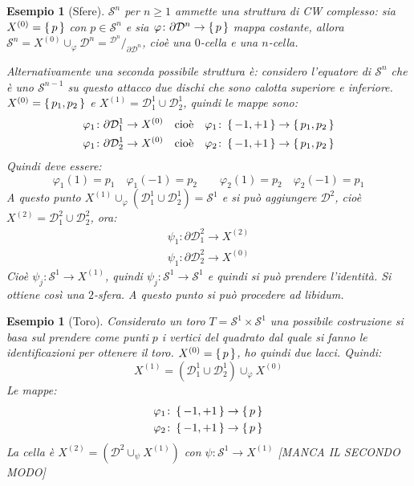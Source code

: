 \documentclass[10pt, twoside=false, x11names]{scrbook}
\newtheorem{example}[theorem]{Esempio}
\renewcommand{\phi}{\varphi}
\newcommand{\Sph}[1][]{\mathcal{S}^#1}
\newcommand{\Disk}[1][]{\mathcal{D}^#1}
\newcommand*\quot[2]{{^{\textstyle #1}\big/_{\textstyle #2}}}
\begin{document}
\begin{example}[Sfere]
  $ \Sph{n} $ per $ n \geq 1 $ ammette una struttura di CW complesso: sia $ X^{(0)} = \set{p} $ con
  $ p \in \Sph{n} $ e sia $ \phi \colon \partial \Disk{n} \to \set{p} $ mappa costante, allora
  $ \Sph{n} = X^{(0)} \cup_\phi \Disk{n} = \quot{\Disk{n}}{\partial \Disk{n}} $, cioè una $ 0 $-cella e una
  $ n $-cella.

  Alternativamente una seconda possibile struttura è: considero l'equatore di $ \Sph{n} $ che
  è uno $ \Sph{n-1} $ su questo attacco due dischi che sono calotta superiore e inferiore.
  $ X^{(0)} = \set{p_1, p_2} $ e $ X^{(1)} = \Disk{1}_1 \cup \Disk{1}_2 $, quindi le mappe
  sono:
  \begin{gather*}
    \phi_1 \colon \partial \Disk{1}_1 \to X^{(0)} \quad \text{cioè} \quad \phi_1 \colon \set{-1, +1} \to \set{p_1, p_2} \\
    \phi_1 \colon \partial \Disk{1}_2 \to X^{(0)} \quad \text{cioè} \quad \phi_2 \colon \set{-1, +1} \to \set{p_1, p_2}
  \end{gather*}
  Quindi deve essere:
  \[
    \phi_1(1) = p_1 \quad \phi_1(-1) = p_2 \qquad  \phi_2(1) = p_2 \quad \phi_2(-1) = p_1
  \]
  A questo punto $ X^{(1)} \cup_\phi (\Disk{1}_1 \cup \Disk{1}_2) = \Sph{1} $ e si può aggiungere
  $ \Disk{2} $, cioè $ X^{(2)} = \Disk{2}_1 \cup \Disk{2}_2 $, ora:
  \begin{gather*}
    \psi_1 \colon \partial \Disk{2}_1 \to X^{(2)} \\
    \psi_1 \colon \partial \Disk{2}_2 \to X^{(0)}
  \end{gather*}
  Cioè $ \psi_j \colon \Sph{1} \to X^{(1)} $, quindi $ \psi_j \colon \Sph{1} \to \Sph{1} $ e quindi si può prendere
  l'identità. Si ottiene così una $ 2 $-sfera. A questo punto si può procedere ad libidum.
\end{example}

\begin{example}[Toro]
  Considerato un toro $ T = \Sph{1} \times \Sph{1} $ una possibile costruzione si basa sul prendere
  come punti $ p $ i vertici del quadrato dal quale si fanno le identificazioni per ottenere il
  toro. $ X^{(0)} = \set{p} $, ho quindi due lacci. Quindi:
  \[
    X^{(1)} = (\Disk{1}_1 \cup \Disk{1}_2) \cup_\phi X^{(0)}
  \]
  Le mappe:
  \begin{gather*}
    \phi_1 \colon \set{-1, +1} \to \set{p} \\
    \phi_2 \colon \set{-1, +1} \to \set{p}
  \end{gather*}
  La cella è $ X^{(2)} = (\Disk{2} \cup_\psi X^{(1)}) $ con $ \psi \colon \Sph{1} \to X^{(1)} $
  [MANCA IL SECONDO MODO]
\end{example}
\end{document}
